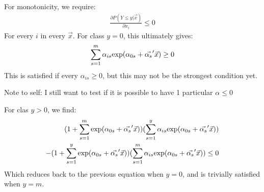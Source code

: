 \documentclass[12pt]{article}
\begin{document}
For monotonicity, we require:
\begin{align*}
	\frac{\partial P(Y \leq y | \vec{x})}{\partial x_i} \leq 0
\end{align*}
For every $i$ in every $\vec{x}$. For class $y = 0$, this ultimately gives:
\begin{align*}
	\sum_{s = 1}^{m} \alpha_{is} \textup{exp} (\alpha_{0s} + \vec{\alpha_{s}}' \vec{x}) \geq 0
\end{align*}
This is satisfied if every $\alpha_{is} \geq 0$, but this may not be the strongest condition yet.

Note to self: I still want to test if it is possible to have 1 particular $\alpha \leq 0$

For clas $y > 0$, we find:
\begin{align*}
	(1 + \sum_{s = 1}^{m} \textup{exp} (\alpha_{0s} + \vec{\alpha_{s}}' \vec{x}))(\sum_{s = 1}^{y} \alpha_{is} \textup{exp} (\alpha_{0s} + \vec{\alpha_{s}}' \vec{x})) \\
	- (1 + \sum_{s = 1}^{y} \textup{exp} (\alpha_{0s} + \vec{\alpha_{s}}' \vec{x}))(\sum_{s = 1}^{m} \alpha_{is} \textup{exp} (\alpha_{0s} + \vec{\alpha_{s}}' \vec{x})) \leq 0
\end{align*}
Which reduces back to the previous equation when $y = 0$, and is trivially satisfied when $y = m$. 
\end{document}
